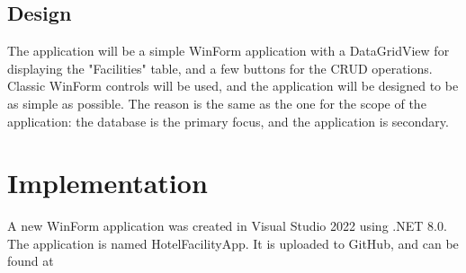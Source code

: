 \subsection{Design}
The application will be a simple WinForm application with a DataGridView for displaying the "Facilities" table, and a few buttons for the CRUD operations.
Classic WinForm controls will be used, and the application will be designed to be as simple as possible. 
The reason is the same as the one for the scope of the application: the database is the primary focus, and the application is secondary.


\section{Implementation}
A new WinForm application was created in Visual Studio 2022 using .NET 8.0. The application is named HotelFacilityApp. It is uploaded to GitHub, and can be found at \url{}
